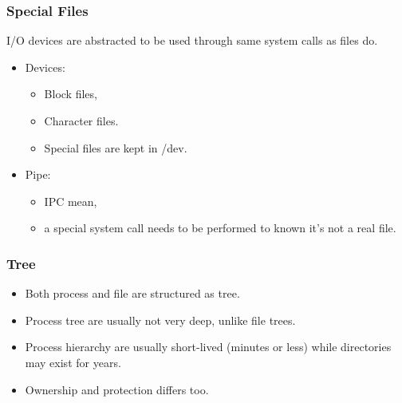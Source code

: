   \begin{frame}
    \frametitle{Special Files}
      I/O devices are abstracted to be used through same system calls as files do.
      \begin{itemize}
        \item Devices:
          \begin{itemize}
            \item Block files,
            \item Character files.
            \item Special files are kept in /dev.
          \end{itemize}
        \item Pipe:
          \begin{itemize}
            \item IPC mean,
            \item a special system call needs to be performed to known it's not a real file.
          \end{itemize}
      \end{itemize}
  \end{frame}

  \begin{frame}
    \frametitle{Tree}
      \begin{itemize}
        \item Both process and file are structured as tree.
        \item Process tree are usually not very deep, unlike file trees.
        \item Process hierarchy are usually short-lived (minutes or less) while directories may exist for years.
        \item Ownership and protection differs too.
      \end{itemize}
  \end{frame}
